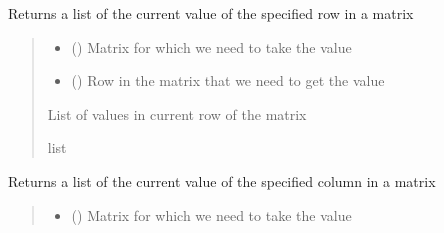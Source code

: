 \documentclass[letterpaper,10pt,english]{sphinxmanual}
\begin{document}
\begin{fulllineitems}
\begin{fulllineitems}
\end{fulllineitems}


\begin{fulllineitems}
\label{\detokenize{board_resolver:board_resolver.BoardResolver.getRow}}
\pysigstartsignatures
{}
\pysigstopsignatures
\sphinxAtStartPar
Returns a list of the current value of the specified row in a matrix
\begin{quote}\begin{description}
\begin{itemize}
\item {} 
\sphinxAtStartPar
{} () \textendash{} Matrix for which we need to take the value

\item {} 
\sphinxAtStartPar
{} () \textendash{} Row in the matrix that we need to get the value

\end{itemize}

\sphinxAtStartPar
List of values in current row of the matrix

\sphinxAtStartPar
list

\end{description}\end{quote}

\end{fulllineitems}


\begin{fulllineitems}
\label{\detokenize{board_resolver:board_resolver.BoardResolver.getCol}}
\pysigstartsignatures
{}
\pysigstopsignatures
\sphinxAtStartPar
Returns a list of the current value of the specified column
in a matrix
\begin{quote}\begin{description}
\begin{itemize}
\item {} 
\sphinxAtStartPar
{} () \textendash{} Matrix for which we need to take the value


\end{itemize}
\end{description}
\end{quote}
\end{fulllineitems}
\end{fulllineitems}
\end{document}
